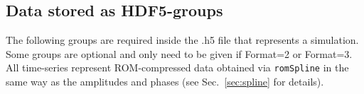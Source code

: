 \documentclass[11pt,tightenlines,article,amssymb,amsmath,amsfonts,superscriptaddress,nofootinbib]{revtex4}
\begin{document}




%
%

%

\newpage
\subsection{Data stored as HDF5-groups}
\label{sec:format:groups}
The following groups are required inside the .h5 file that represents
a simulation.
Some groups are optional and only need to be given if Format=2 or Format=3.
All time-series represent ROM-compressed data obtained via
\texttt{romSpline} in the same way as the amplitudes and phases (see
Sec.~\ref{sec:spline} for details). \\
\end{document}
